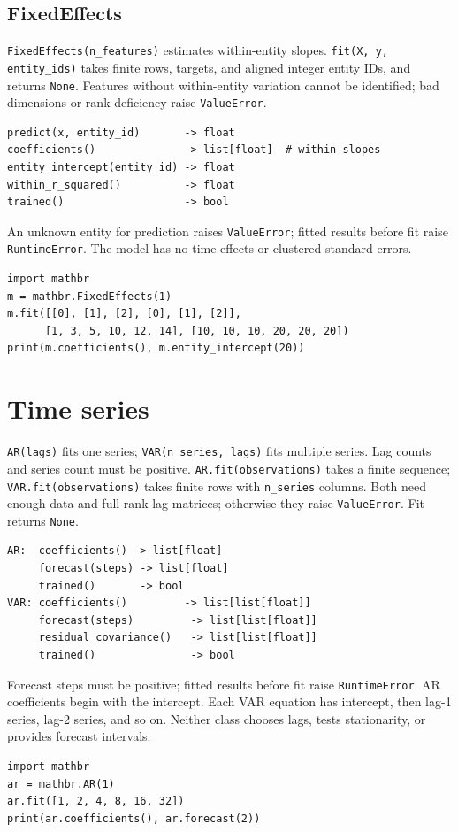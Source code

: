\documentclass[11pt,a4paper]{article}
\begin{document}
\subsection{FixedEffects}
\verb|FixedEffects(n_features)| estimates within-entity slopes. \verb|fit(X, y, entity_ids)| takes finite rows, targets, and aligned integer entity IDs, and returns \verb|None|. Features without within-entity variation cannot be identified; bad dimensions or rank deficiency raise \verb|ValueError|.
\begin{verbatim}
predict(x, entity_id)       -> float
coefficients()              -> list[float]  # within slopes
entity_intercept(entity_id) -> float
within_r_squared()          -> float
trained()                   -> bool
\end{verbatim}
An unknown entity for prediction raises \verb|ValueError|; fitted results before fit raise \verb|RuntimeError|. The model has no time effects or clustered standard errors.
\begin{verbatim}
import mathbr
m = mathbr.FixedEffects(1)
m.fit([[0], [1], [2], [0], [1], [2]],
      [1, 3, 5, 10, 12, 14], [10, 10, 10, 20, 20, 20])
print(m.coefficients(), m.entity_intercept(20))
\end{verbatim}

\section{Time series}
\verb|AR(lags)| fits one series; \verb|VAR(n_series, lags)| fits multiple series. Lag counts and series count must be positive. \verb|AR.fit(observations)| takes a finite sequence; \verb|VAR.fit(observations)| takes finite rows with \verb|n_series| columns. Both need enough data and full-rank lag matrices; otherwise they raise \verb|ValueError|. Fit returns \verb|None|.
\begin{verbatim}
AR:  coefficients() -> list[float]
     forecast(steps) -> list[float]
     trained()       -> bool
VAR: coefficients()         -> list[list[float]]
     forecast(steps)         -> list[list[float]]
     residual_covariance()   -> list[list[float]]
     trained()               -> bool
\end{verbatim}
Forecast steps must be positive; fitted results before fit raise \verb|RuntimeError|. AR coefficients begin with the intercept. Each VAR equation has intercept, then lag-1 series, lag-2 series, and so on. Neither class chooses lags, tests stationarity, or provides forecast intervals.
\begin{verbatim}
import mathbr
ar = mathbr.AR(1)
ar.fit([1, 2, 4, 8, 16, 32])
print(ar.coefficients(), ar.forecast(2))
\end{verbatim}
\end{document}

